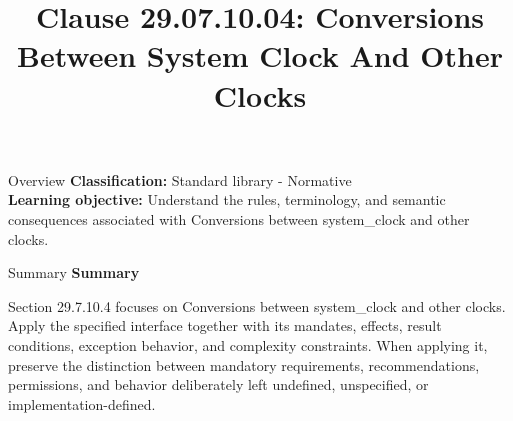 \documentclass[10pt,letterpaper]{article}
\title{Clause 29.07.10.04: Conversions Between System Clock And Other Clocks}
\author{}
\date{}
\begin{document}
\maketitle
\begin{CornellOverviewBox}{Overview}
\textbf{Classification:} Standard library - Normative\\[2pt]
\textbf{Learning objective:} Understand the rules, terminology, and semantic consequences associated with Conversions between system\_clock and other clocks.
\end{CornellOverviewBox}\begin{CornellSummaryBox}{Summary}
{\sffamily\bfseries\color{Accent} Summary}\par\vspace{3pt}Section 29.7.10.4 focuses on Conversions between system\_clock and other clocks. Apply the specified interface together with its mandates, effects, result conditions, exception behavior, and complexity constraints. When applying it, preserve the distinction between mandatory requirements, recommendations, permissions, and behavior deliberately left undefined, unspecified, or implementation-defined.
\end{CornellSummaryBox}
\end{document}
